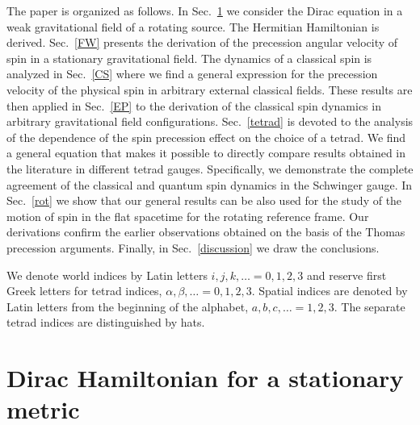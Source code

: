 \documentclass[preprint,showpacs,preprintnumbers,amsmath,amssymb]{revtex4}
\begin{document}
The paper is organized as follows. In Sec.~\ref{Hamiltonian} we consider the
Dirac equation in a weak gravitational field of a rotating source. The Hermitian
Hamiltonian is derived. Sec.~\ref{FW} presents the derivation of the precession
angular velocity of spin in a stationary gravitational field. The dynamics of
a classical spin is analyzed in Sec.~\ref{CS} where we find a general expression
for the precession velocity of the physical spin in arbitrary external classical
fields. These results are then applied in Sec.~\ref{EP} to the derivation of the
classical spin dynamics in arbitrary gravitational field configurations.
Sec.~\ref{tetrad} is devoted to the analysis of the dependence of the spin
precession effect on the choice of a tetrad. We find a general equation that
makes it possible to directly compare results obtained in the literature
in different tetrad gauges. Specifically, we demonstrate the complete agreement
of the classical and quantum spin dynamics in the Schwinger gauge. In Sec.~\ref{rot}
we show that our general results can be also used for the study of the motion of
spin in the flat spacetime for the rotating reference frame. Our derivations
confirm the earlier observations obtained on the basis of the Thomas precession
arguments. Finally, in Sec.~\ref{discussion} we draw the conclusions.

We denote world indices by Latin letters $i,j,k,\dots = 0,1,2,3$
and reserve first Greek letters for tetrad indices, $\alpha,\beta,\dots =
0,1,2,3$. Spatial indices are denoted by Latin letters from the
beginning of the alphabet, $a,b,c,\dots = 1,2,3$.
The separate tetrad indices are distinguished by hats.

\section{Dirac Hamiltonian for a stationary metric}\label{Hamiltonian}
\end{document}
